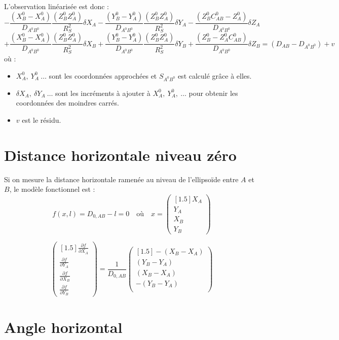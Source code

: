 \documentclass[french]{report}
\begin{document}
L'observation linéarisée est donc :
$$
-\frac{ (X_B^0-X_A^0) }{D_{A^0 B^0}} \frac{ (Z_B^0 Z_A^0) }{R_S^2} \delta X_A
-\frac{ (Y_B^0-Y_A^0) }{D_{A^0 B^0}} \frac{ (Z_B^0 Z_A^0) }{R_S^2} \delta Y_A
-\frac{ (Z_B^0 C_{AB}^0 -Z_A^0) }{D_{A^0 B^0}} \delta Z_A
$$
$$
+\frac{ (X_B^0-X_A^0) }{D_{A^0 B^0}} \frac{ (Z_B^0 Z_A^0) }{R_S^2} \delta X_B
+\frac{ (Y_B^0-Y_A^0) }{D_{A^0 B^0}} \frac{ (Z_B^0 Z_A^0) }{R_S^2} \delta Y_B
+\frac{ (Z_B^0 -Z_A^0 C_{AB}^0) }{D_{A^0 B^0}} \delta Z_B
=(D_{AB} -D_{A^0 B^0}) + v
$$
où :
\begin{itemize}
\item $X_A^0,\ Y_A^0\ \dots$ sont les coordonnées approchées et $S_{A^0 B^0}$ est calculé grâce à elles.
\item $\delta X_A,\ \delta Y_A \ \dots$ sont les incréments à ajouter à $X_A^0, \ Y_A^0,\ \dots$ pour obtenir les coordonnées des moindres carrés.
\item $v$ est le résidu.
\end{itemize}


\section{Distance horizontale niveau zéro}

Si on mesure la distance horizontale ramenée au niveau de l'ellipsoïde entre $A$ et $B$, le modèle fonctionnel est :
$$ f(x,l)=D_{0,AB}-l=0
\quad \text{où} \quad x=
\begin{pmatrix}[1.5] X_A\\ Y_A\\ X_B\\ Y_B \end{pmatrix}$$

$$\begin{pmatrix}[1.5]
\frac{\partial f}{\partial X_A}\\
\frac{\partial f}{\partial Y_A}\\
\frac{\partial f}{\partial X_B}\\
\frac{\partial f}{\partial Y_B} \end{pmatrix}
= \frac{1}{D_{0,AB}}
\begin{pmatrix}[1.5]
-(X_B-X_A) \\
(Y_B-Y_A) \\
(X_B-X_A) \\
-(Y_B-Y_A) \\
\end{pmatrix}$$


\section{Angle horizontal}
\label{sec:anghz}
\end{document}
